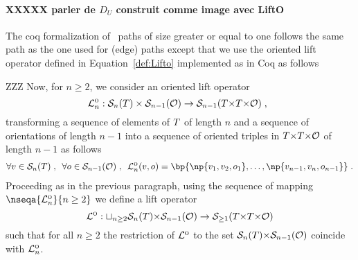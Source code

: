 \documentclass[12pt]{article}
\begin{document}
{{{\paragraph{XXXXX  parler de $D_U$ construit comme image avec LiftO}
The coq formalization of \undirectedEdgePaths\ paths of size greater or equal to
one follows the same path as the one used for (edge) paths except that we use
the oriented lift operator defined in Equation~\eqref{def:Lifto} implemented as 
in Coq as follows
{\small {}}

ZZZ  Now, for $n\ge 2$, we consider an oriented lift operator
\begin{equation}
  {\cal L}^{\text{\sc o}}_n: {\cal S}_{n}(T)\times{\cal S}_{n-1}({\cal O}) \to
  {\cal S}_{n{-}1}(T{\times}T{\times}{\cal O})
  \; , \enspace
\end{equation}
transforming a sequence of elements of $T$ of length $n$ and a sequence of orientations of length $n{-}1$ into a
sequence of oriented triples in $T{\times}T{\times}{\cal O}$ of length
$n{-}1$ as follows
\begin{align}
  \forall \vertex\in \Sequence_n(\fullset)
  \eqsepv
  \forall o\in \Sequence_{n-1}(\Orientation)
  \eqsepv
  \Lifto_n(v,o) = \bp{\np{\vertex_1, \vertex_2,o_1},\dots,
  \np{\vertex_{n-1},\vertex_n,o_{n-1}}}
  \eqfinp
  \label{def:Lifto}
\end{align}
Proceeding as in the previous paragraph, using the sequence of mapping
$\nseqa{\Lifto_n}{n\ge 2}$ we define a lift operator
$${\cal L}^{\text{\sc o}}: \sqcup_{n\ge 2} {\cal S}_{n}(T){\times}{\cal S}_{n-1}({\cal O})
\to {\cal S}_{\ge 1}(T{\times}T{\times}{\cal O})$$ such that for all
$n \ge 2$ the restriction of ${\cal L}^{\text{\sc o}}$ to the set
${\cal S}_{n}(T){\times}{\cal S}_{n-1}({\cal O})$ coincide with
${\cal L}^{\text{\sc o}}_n$.


}}}
\end{document}

